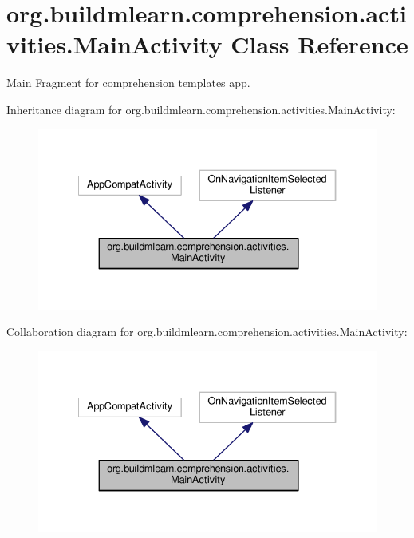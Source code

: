 \hypertarget{classorg_1_1buildmlearn_1_1comprehension_1_1activities_1_1MainActivity}{}\section{org.\+buildmlearn.\+comprehension.\+activities.\+Main\+Activity Class Reference}
\label{classorg_1_1buildmlearn_1_1comprehension_1_1activities_1_1MainActivity}


Main Fragment for comprehension template\textquotesingle{}s app.  




Inheritance diagram for org.\+buildmlearn.\+comprehension.\+activities.\+Main\+Activity\+:
\nopagebreak
\begin{figure}[H]
\begin{center}
\leavevmode
\includegraphics[width=334pt]{classorg_1_1buildmlearn_1_1comprehension_1_1activities_1_1MainActivity__inherit__graph}
\end{center}
\end{figure}


Collaboration diagram for org.\+buildmlearn.\+comprehension.\+activities.\+Main\+Activity\+:
\nopagebreak
\begin{figure}[H]
\begin{center}
\leavevmode
\includegraphics[width=334pt]{classorg_1_1buildmlearn_1_1comprehension_1_1activities_1_1MainActivity__coll__graph}
\end{center}
\end{figure}
